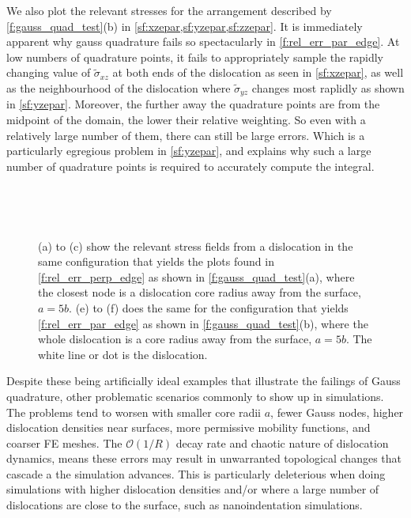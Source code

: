 \documentclass[11pt]{iopart}
\begin{document}
We also plot the relevant stresses for the arrangement described by \cref{f:gauss_quad_test}(b) in \cref{sf:xzepar,sf:yzepar,sf:zzepar}. It is immediately apparent why gauss quadrature fails so spectacularly in \cref{f:rel_err_par_edge}. At low numbers of quadrature points, it fails to appropriately sample the rapidly changing value of $\tilde{\sigma}_{xz}$ at both ends of the dislocation as seen in \cref{sf:xzepar}, as well as the neighbourhood of the dislocation where $\tilde{\sigma}_{yz}$ changes most raplidly as shown in \cref{sf:yzepar}. Moreover, the further away the quadrature points are from the midpoint of the domain, the lower their relative weighting. So even with a relatively large number of them, there can still be large errors. Which is a particularly egregious problem in \cref{sf:yzepar}, and explains why such a large number of quadrature points is required to accurately compute the integral.
\begin{figure}
    \centering
    ~
    ~

    ~
    ~
    \caption{(a) to (c) show the relevant stress fields from a dislocation in the same configuration that yields the plots found in \cref{f:rel_err_perp_edge} as shown in \cref{f:gauss_quad_test}(a), where the closest node is a dislocation core radius away from the surface, $a = 5b$. (e) to (f) does the same for the configuration that yields \cref{f:rel_err_par_edge} as shown in \cref{f:gauss_quad_test}(b), where the whole dislocation is a core radius away from the surface, $a = 5b$. The white line or dot is the dislocation.}
    \label{f:sigma_edge_test_config}
\end{figure}

Despite these being artificially ideal examples that illustrate the failings of Gauss quadrature, other problematic scenarios commonly to show up in simulations. The problems tend to worsen with smaller core radii $a$, fewer Gauss nodes, higher dislocation densities near surfaces, more permissive mobility functions, and coarser FE meshes. The $\mathcal{O}(1/R)$ decay rate and chaotic nature of dislocation dynamics, means these errors may result in unwarranted topological changes that cascade a the simulation advances. This is particularly deleterious when doing simulations with higher dislocation densities and/or where a large number of dislocations are close to the surface, such as nanoindentation simulations.
\end{document}

